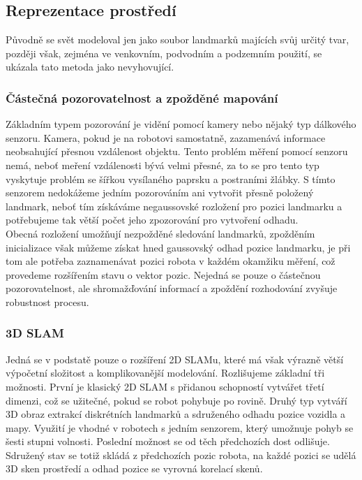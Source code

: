 \documentclass[11pt]{article}
\begin{document}
\subsection{Reprezentace prostředí}
Původně se svět modeloval jen jako soubor landmarků majících svůj určitý tvar, později však, zejména ve venkovním, podvodním a podzemním použití, se ukázala tato metoda jako nevyhovující.

\subsubsection{Částečná pozorovatelnost a zpožděné mapování}
Základním typem pozorování je vidění pomocí kamery nebo nějaký typ dálkového senzoru. Kamera, pokud je na robotovi samostatně, zazamenává informace neobsahující přesnou vzdálenost objektu. Tento problém měření pomocí senzoru nemá, neboť meření vzdálenosti bývá velmi přesné, za to se pro tento typ vyskytuje problém se šířkou vysílaného paprsku a postraními žlábky. S tímto senzorem nedokážeme jedním pozorováním ani vytvořit přesně položený landmark, neboť tím získáváme negaussovské rozložení pro pozici landmarku a potřebujeme tak větší počet jeho zpozorování pro vytvoření odhadu.\\
\indent Obecná rozložení umožňují nezpožděné sledování landmarků, zpožděním inicializace však můžeme získat hned gaussovský odhad pozice landmarku, je při tom ale potřeba zaznamenávat pozici robota v každém okamžiku měření, což provedeme rozšířením stavu o vektor pozic. Nejedná se pouze o částečnou pozorovatelnost, ale shromažďování informací a zpoždění rozhodování zvyšuje robustnost procesu. 

\subsubsection{3D SLAM}
Jedná se v podstatě pouze o rozšíření 2D SLAMu, které má však výrazně větší výpočetní složitost a komplikovanější modelování. Rozlišujeme základní tři možnosti. První je klasický 2D SLAM s přidanou schopností vytvářet třetí dimenzi, což se užitečné, pokud se robot pohybuje po rovině. Druhý typ vytváří 3D obraz extrakcí diskrétních landmarků a sdruženého odhadu pozice vozidla a mapy. Využití je vhodné v robotech s jedním senzorem, který umožnuje pohyb se šesti stupni volnosti. Poslední možnost se od těch předchozích dost odlišuje. Sdružený stav se totiž skládá z předchozích pozic robota, na každé pozici se udělá 3D sken prostředí a odhad pozice se vyrovná korelací skenů.
 
\end{document}
